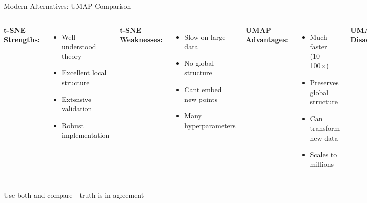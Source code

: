 \documentclass[aspectratio=169]{beamer}
\begin{document}
\begin{frame}{Modern Alternatives: UMAP Comparison}
\begin{columns}
\textbf{t-SNE Strengths:}
\begin{itemize}
\item Well-understood theory
\item Excellent local structure
\item Extensive validation
\item Robust implementation
\end{itemize}

\textbf{t-SNE Weaknesses:}
\begin{itemize}
\item Slow on large data
\item No global structure
\item Cant embed new points
\item Many hyperparameters
\end{itemize}

\textbf{UMAP Advantages:}
\begin{itemize}
\item Much faster (10-100×)
\item Preserves global structure
\item Can transform new data
\item Scales to millions
\end{itemize}

\textbf{UMAP Disadvantages:}
\begin{itemize}
\item Less theoretical foundation
\item More parameters to tune
\item Less stable
\item Newer, less tested
\end{itemize}
\end{columns}

\colorbox{yellow!30}{Use both and compare - truth is in agreement}
\end{frame}
\end{document}
